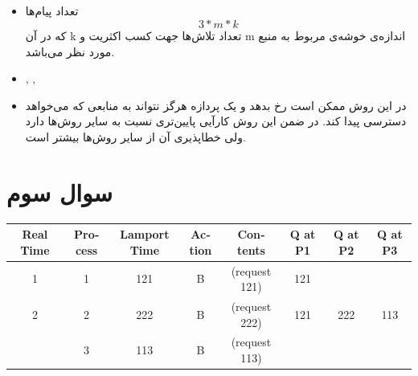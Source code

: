 \documentclass[paper=a4, fontsize=11pt]{article}
\numberwithin{equation}{section} %
\numberwithin{figure}{section} %
\numberwithin{table}{section} %
\begin{document}
\subsection{}
\begin{itemize}
    \item تعداد پیام‌ها
    \[
    3 * m * k
    \]
    که در آن k تعداد تلاش‌ها جهت کسب اکثریت و m اندازه‌ی خوشه‌ی مربوط به منبع مورد نظر می‌باشد.
    \item {}, , 
    \item
    در این روش ممکن است  رخ بدهد
    و یک پردازه هرگز نتواند به منابعی که می‌خواهد دسترسی پیدا کند.
    در ضمن این روش کارآیی پایین‌تری نسبت به سایر روش‌ها دارد ولی خطاپذیری آن از سایر روش‌ها بیشتر است.
\end{itemize}

\section{سوال سوم}

\begin{latin}\begin{tabular}{| c | c | c | c | c | c | c | c |}
    \hline
    Real Time & Process & Lamport Time & Action & Contents & Q at P1 & Q at P2 & Q at P3 \\
    \hline
    1 & 1 & 121 & B & (request 121) & 121 & & \\
    \hline
    2 & 2 & 222 & B & (request 222) & 121 & 222 & 113 \\
      & 3 & 113 & B & (request 113) & & & \\
    \hline
\end{tabular}\end{latin}
\end{document}
